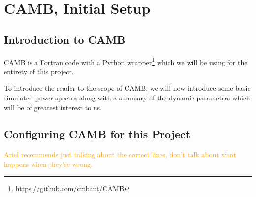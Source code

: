\chapter{CAMB, Initial Setup}

\section{Introduction to CAMB}

CAMB is a Fortran code with a Python wrapper\footnote{
\url{https://github.com/cmbant/CAMB}
} which we will be using for the
entirety of this project.

To introduce the reader to the scope of CAMB, we will now introduce
some basic simulated power spectra along with a summary of the dynamic
parameters which will be of greatest interest to us.

\section{Configuring CAMB for this Project}

\begin{comment}
\textcolor{blue}{
I hope to, in painstaking detail, cover many of the lines of the code that I
have written to interface with CAMB. I will include plots to indicate, at
every step, what incorrect settings cause the power spectrum to look like (or,
for subtler errors, what the error curves looked like compared to Ariel's
results, which I treated as a sort of ``ground truth''). This should also be a
good example to flex my physics interpretation skills: why does this incorrect
setting produce this undesired pattern?}

\textcolor{blue}{You might think that this is sort of an inappropriate 
section
for a master's thesis (especially since I have in mind that this be a lengthy 
section), but I would like to include it unless you feel very strongly. After
all, I spent several months of the project debugging at least ten different 
ways that slight and major errors in the various settings led to 
irreconcilable results.}
\end{comment}

\textcolor{orange}{Ariel recommends
just talking about the correct lines, don't talk about what happens when
they're wrong.}

\begin{comment}
In figure \ref{fig: spectrum_type}, we can see that requesting of the wrong
power spectrum type can in some low-$\omega_\nu$ cases yields errors so low
that we might accidentally overlook them. This error pattern is easily
recognizable and is a consequence of the definition of the power spectrum: the
Fourier transform  of the two-point correlation function. ...Okay, I'm still 
thinking about this. I don't understand %
\end{comment}

